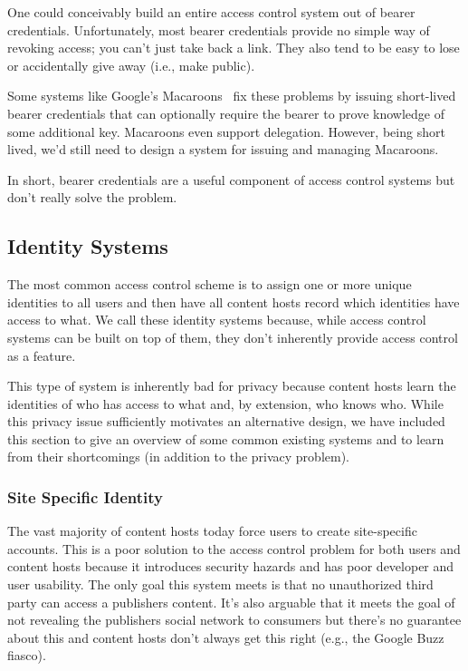 \documentclass[pdftex,12pt,a4papaer]{report}
\begin{document}
One could conceivably build an entire access control system out of bearer
credentials. Unfortunately, most bearer credentials provide no simple way of
revoking access; you can't just take back a link. They also tend to be easy to
lose or accidentally give away (i.e., make public).

Some systems like Google's Macaroons~\cite{macaroon} fix these problems by
issuing short-lived bearer credentials that can optionally require the bearer to
prove knowledge of some additional key. Macaroons even support delegation.
However, being short lived, we'd still need to design a system for issuing and
managing Macaroons.

In short, bearer credentials are a useful component of access control systems
but don't really solve the problem.

\subsection{Identity Systems}

The most common access control scheme is to assign one or more unique identities
to all users and then have all content hosts record which identities have access
to what. We call these identity systems because, while access control systems
can be built on top of them, they don't inherently provide access control as a
feature.

This type of system is inherently bad for privacy because content hosts learn
the identities of who has access to what and, by extension, who knows who. While
this privacy issue sufficiently motivates an alternative design, we have
included this section to give an overview of some common existing systems and to
learn from their shortcomings (in addition to the privacy problem).

\subsubsection{Site Specific Identity}

The vast majority of content hosts today force users to create site-specific
accounts. This is a poor solution to the access control problem for both users
and content hosts because it introduces security hazards and has poor developer
and user usability. The only goal this system meets is that no unauthorized
third party can access a publishers content. It's also arguable that it
meets the goal of not revealing the publishers social network to consumers
but there's no guarantee about this and content hosts don't always get this
right (e.g., the Google Buzz~\cite{google-buzz} fiasco).
\end{document}
